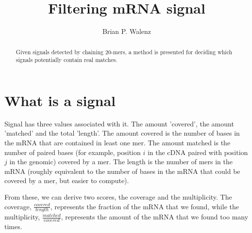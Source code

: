 \documentclass[twoside]{article}
\begin{document}
%
%
\newcommand{\entrylabel}[1]{\mbox{\texttt{#1:}}\hfil}
\newenvironment{entry}
  {\begin{list}{}%
   {\renewcommand{\makelabel}{\entrylabel}%
   }}
{\end{list}}

\newcommand{\Lentrylabel}[1]{%
  {\parbox[b]{0pt}{\makebox[0pt][l]{\texttt{#1:}}\\}}\hfil\relax}
\newenvironment{Lentry}
  {\renewcommand{\entrylabel}{\Lentrylabel}\begin{entry}}
  {\end{entry}}

\title{Filtering mRNA signal}
\author{Brian P. Walenz}
\maketitle

\pagestyle{fancy}

\lhead[\today]{\today}

\normalem

\begin{abstract}
Given signals detected by chaining 20-mers, a method is presented for
deciding which signals potentially contain real matches.
\end{abstract}

\section{What is a signal}

Signal has three values associated with it.  The amount 'covered', the
amount 'matched' and the total 'length'.
%
The amount covered is the number of
bases in the mRNA that are contained in least one mer.
%
The amount matched is the number of paired bases (for example, position
$i$ in the cDNA paired with position $j$ in the genomic) covered by a mer.
%
The length is the number of mers in the mRNA (roughly equivalent to the
number of bases in the mRNA that could be covered by a mer, but easier
to compute).

From these, we can derive two scores, the coverage and the multiplicity.
The coverage, $\frac{covered}{length}$, represents the fraction of the mRNA
that we found, while the multiplicity, $\frac{matched}{covered}$, represents
the amount of the mRNA that we found too many times.
\end{document}
